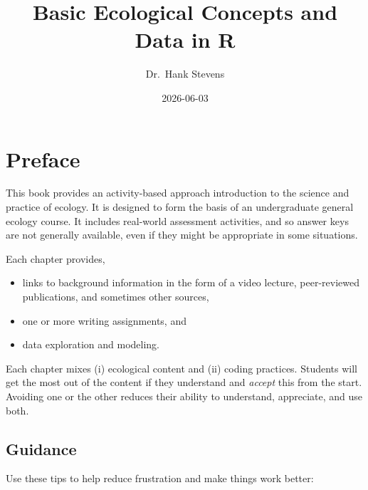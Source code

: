 \documentclass[
  letterpaper,
  DIV=11,
  numbers=noendperiod]{scrreprt}
\title{Basic Ecological Concepts and Data in R}
\author{Dr.~Hank Stevens}
\date{2026-06-03}
\providecommand{\tightlist}{%
  \setlength{\itemsep}{0pt}\setlength{\parskip}{0pt}}
\renewcommand*\contentsname{Table of contents}
\newcommand\contentsname{Table of contents}
\begin{document}
\maketitle

\renewcommand*\contentsname{Table of contents}
{
\hypersetup{linkcolor=}
\setcounter{tocdepth}{2}
\tableofcontents
}


\chapter*{Preface}\label{preface}


This book provides an activity-based approach introduction to the
science and practice of ecology. It is designed to form the basis of an
undergraduate general ecology course. It includes real-world assessment
activities, and so answer keys are not generally available, even if they
might be appropriate in some situations.

Each chapter provides,

\begin{itemize}
\tightlist
\item
  links to background information in the form of a video lecture,
  peer-reviewed publications, and sometimes other sources,
\item
  one or more writing assignments, and
\item
  data exploration and modeling.
\end{itemize}

Each chapter mixes (i) ecological content and (ii) coding practices.
Students will get the most out of the content if they understand and
\emph{accept} this from the start. Avoiding one or the other reduces
their ability to understand, appreciate, and use both.

\section*{Guidance}\label{guidance}


Use these tips to help reduce frustration and make things work better:
\end{document}
